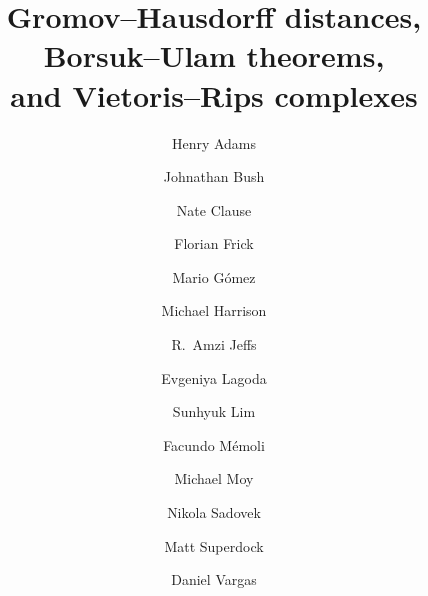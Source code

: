 \documentclass[11pt, reqno, english]{amsart}
\begin{document}
\title[Gromov--Hausdorff distances, Borsuk--Ulam theorems, and Vietoris--Rips complexes]{Gromov--Hausdorff distances, Borsuk--Ulam theorems,\\ and Vietoris--Rips complexes}

\pagestyle{plain}

\author{Henry Adams}
\address[HA]{Department of Mathematics, Colorado State University, Fort Collins, CO 80523, USA}

\author{Johnathan Bush}
\address[JB]{Department of Mathematics, University of Florida, Gainesville, FL 32611, USA}

\author{Nate Clause}
\address[NC]{Department of Mathematics,
The Ohio State University, Columbus, OH 43202, USA}

\author{Florian Frick}
\address[FF]{Dept.\ Math.\ Sciences, Carnegie Mellon University, Pittsburgh, PA 15213, USA}

\author{Mario G\'{o}mez}
\address[MG]{Department of Mathematics,
The Ohio State University, Columbus, OH 43202, USA}

\author{Michael Harrison}
\address[MH]{Institute for Advanced Study, Princeton, NJ 08540, USA}

\author{R.~Amzi Jeffs}
\address[RAJ]{Dept.\ Math.\ Sciences, Carnegie Mellon University, Pittsburgh, PA 15213, USA}

\author{Evgeniya Lagoda}
\address[EL]{Freie Universit\"at Berlin}

\author{Sunhyuk Lim}
\address[SL]{Max Planck Institute for Mathematics in the Sciences, Inselstraße 22, 04103 Leipzig, Germany}

\author{Facundo M\'emoli}
\address[FM]{The Ohio State University}

\author{Michael Moy}
\address[MM]{Department of Mathematics, Colorado State University, Fort Collins, CO 80523, USA}

\author{Nikola Sadovek}
\address[NS]{Freie Universit\"at Berlin}

\author{Matt Superdock}
\address[MS]{Rhodes College, Memphis, TN 38112, USA}

\author{Daniel Vargas}
\address[DV]{Department of Mathematics, Colorado State University, Fort Collins, CO 80523, USA}
\end{document}
